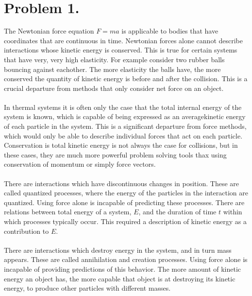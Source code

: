 \documentclass{article}
\begin{document}
\section*{Problem 1.}
The Newtonian force equation $F=ma$ is applicable to bodies that have coordinates that are continuous in time. 
Newtonian forces alone cannot describe interactions whose kinetic energy is conserved. This is true for certain systems that have very, very high elasticity. For example consider two rubber balls bouncing against eachother. The more elasticity the balls have, the more conserved the quantity of kinetic energy is before and after the collision. This is a crucial departure from methods that only consider net force on an object.\\~\\
In thermal systems it is often only the case that the total internal energy of the system is known, which is capable of being expressed as an averagekinetic energy of each particle in the system. This is a significant departure from force methods, which would only be able to describe individual forces that act on each particle. Conservation is total kinetic energy is not always the case for collisions, but in these cases, they are much more powerful problem solving tools thax using conservation of momentum or simply force vectors.\\~\\
There are interactions which have discontinuous changes in position. These are called quantized processes, where the energy of the particles in the interaction are quantized. Using force alone is incapable of predicting these processes. There are relations between total energy of a system, $E$, and the duration of time $t$ within which processes typically occur. This required a description of kinetic energy as a contribution to $E$.\\~\\
There are interactions which destroy energy in the system, and in turn mass appears. These are called annihilation and creation processes. Using force alone is incapable of providing predictions of this behavior. The more amount of kinetic energy an object has, the more capable that object is at destroying its kinetic energy, to produce other particles with different masses.
\end{document}
